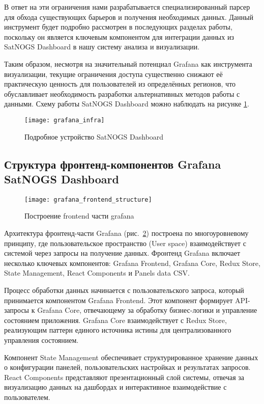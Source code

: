 В ответ на эти ограничения нами разрабатывается специализированный парсер для
обхода существующих барьеров и получения необходимых данных. Данный инструмент
будет подробно рассмотрен в последующих разделах работы, поскольку он является
ключевым компонентом для интеграции данных из SatNOGS Dashboard в нашу систему
анализа и визуализации.

Таким образом, несмотря на значительный потенциал Grafana как инструмента
визуализации, текущие ограничения доступа существенно снижают её практическую
ценность для пользователей из определённых регионов, что обуславливает
необходимость разработки альтернативных методов работы с данными.
Схему работы SatNOGS Dashboard можно наблюдать на рисунке
\ref{fig:grafana_infra}.

\begin{figure}[H]
	\centering
	\texttt{[image: grafana\_infra]}
	\caption{Подробное устройство SatNOGS Dashboard}
	\label{fig:grafana_infra}
\end{figure}

\subsection{Структура фронтенд-компонентов Grafana SatNOGS Dashboard}

\begin{figure}[H]
	\centering
	\texttt{[image: grafana\_frontend\_structure]}
	\caption{Построение frontend части grafana \cite{react_managing_state}}
	\label{fig:grafana_frontend_structure}
\end{figure}

Архитектура фронтенд-части Grafana
(рис.~\ref{fig:grafana_frontend_structure})
построена по многоуровневому принципу, где пользовательское пространство (User
space) взаимодействует с системой через запросы на получение данных. Фронтенд
Grafana включает несколько ключевых компонентов: Grafana Frontend, Grafana
Core, Redux Store, State Management, React Components и Panels data CSV.

Процесс обработки данных начинается с пользовательского запроса, который
принимается компонентом Grafana Frontend. Этот компонент формирует API-запросы
к Grafana Core, отвечающему за обработку бизнес-логики и управление состоянием
приложения. Grafana Core взаимодействует с Redux Store, реализующим паттерн
единого источника истины для централизованного управления состоянием.

Компонент State Management обеспечивает структурированное хранение данных о
конфигурации панелей, пользовательских настройках и результатах запросов. React
Components представляют презентационный слой системы, отвечая за визуализацию
данных на дашбордах и интерактивное взаимодействие с пользователем.


